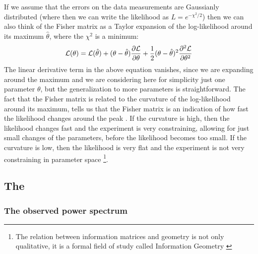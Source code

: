 If we assume that the errors on the data measurements are Gaussianly distributed (where then we can write the likelihood as 
$L = e^{-\chi^2 / 2}$) then we can also think of the Fisher matrix as a Taylor expansion of the log-likelihood around its maximum
$\hat \theta$, where the $\chi^2$ is a minimum:
\begin{equation}
\mathcal{L}(\theta) = \mathcal{L}(\hat \theta) + (\theta - \hat \theta)\frac{\partial{\mathcal{L}}}{\partial{\theta}} + 
\frac{1}{2}(\theta - \hat \theta)^2 \frac{\partial^2{\mathcal{L}}}{\partial{\theta}^2}
\end{equation}
The linear derivative term in the above equation vanishes, since we are expanding around the maximum and we are considering here 
for simplicity just one parameter $\theta$, but the generalization to more parameters is straightforward.
The fact that the Fisher matrix is related to the curvature of the log-likelihood around its maximum, tells us that the Fisher matrix 
is an indication of how fast the likelihood changes around the peak \cite{cite Dodelson...}. 
If the curvature is high, then the likelihood changes
fast and the experiment is very constraining, allowing for just small changes of the parameters, before the likelihood becomes too small.
If the curvature is low, then the likelihood is very flat and the experiment is not very constraining in parameter 
space \footnote{The relation between information matrices and geometry is not only qualitative, it is a 
formal field of study called Information Geometry \cite{cite Springer book}}.

\subsection{The }

\subsubsection{The observed power spectrum}

